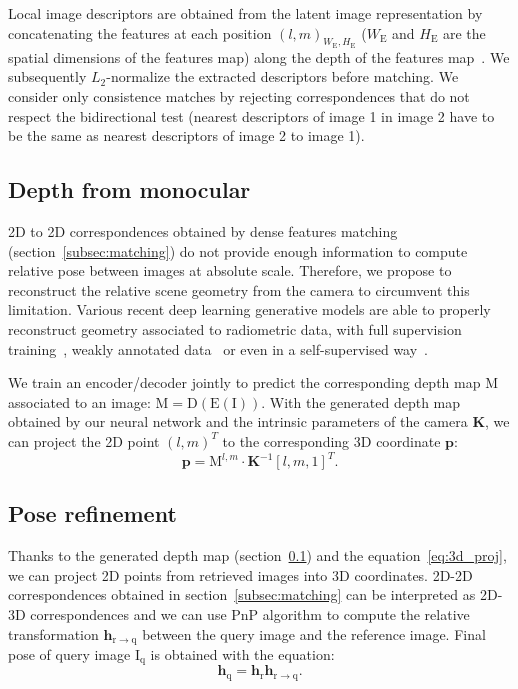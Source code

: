 Local image descriptors are obtained from the latent image representation by concatenating the features at each position $\left( l, m \right)_{W_\mathrm{E},H_\mathrm{E}}$ ($W_\mathrm{E}$ and $H_\mathrm{E}$ are the spatial dimensions of the features map) along the depth of the features map~\citep{Taira2018, Widya2018}. We subsequently $L_2$-normalize the extracted descriptors before matching. We consider only consistence matches by rejecting correspondences that do not respect the bidirectional test (nearest descriptors of image 1 in image 2 have to be the same as nearest descriptors of image 2 to image 1).

\subsection{Depth from monocular}
\label{subsec:depth_map}
2D to 2D correspondences obtained by dense features matching (section~\ref{subsec:matching}) do not provide enough information to compute relative pose between images at absolute scale. Therefore, we propose to reconstruct the relative scene geometry from the camera to circumvent this limitation. Various recent deep learning generative models are able to properly reconstruct geometry associated to radiometric data, with full supervision training~\cite{Eigen2014}, weakly annotated data~\cite{Godard2017} or even in a self-supervised way~\cite{Mahjourian2018}. 

We train an encoder/decoder jointly to predict the corresponding depth map $\mathrm{M}$ associated to an image: $\mathrm{M = D(E(I))}$. With the generated depth map obtained by our neural network and the intrinsic parameters of the camera $\mathbf{K}$, we can project the 2D point $\left( l, m \right)^T$ to the corresponding 3D coordinate $\mathbf{p}$:
\begin{equation}
	\label{eq:3d_proj}
	\mathbf{p} = \mathrm{M}^{l, m} \cdot \mathbf{K}^{-1}[l, m, 1]^T.
\end{equation}

\subsection{Pose refinement}
\label{subsec:pnlp}

Thanks to the generated depth map (section~\ref{subsec:depth_map}) and the equation~\ref{eq:3d_proj}, we can project 2D points from retrieved images into 3D coordinates. 2D-2D correspondences obtained in section~\ref{subsec:matching} can be interpreted as 2D-3D correspondences and we can use PnP algorithm to compute the relative transformation $\mathbf{h}_\mathrm{r \rightarrow q}$ between the query image and the reference image. Final pose of query image $\mathrm{I_q}$ is obtained with the equation:
\begin{equation}
	\mathbf{h}_\mathrm{q} = \mathbf{h}_\mathrm{r}\mathbf{h}_\mathrm{r \rightarrow q}.
\end{equation}

